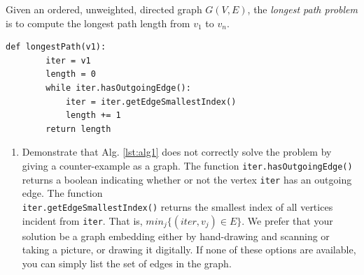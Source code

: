 \documentclass[12pt,letterpaper]{article}
\begin{document}
Given an ordered, unweighted, directed graph $G(V,E)$, the \textit{longest path problem} is to compute the longest path length from $v_1$ to $v_n$.

     \begin{lstlisting}[style = Python]
    def longestPath(v1):
        iter = v1
        length = 0
        while iter.hasOutgoingEdge():
            iter = iter.getEdgeSmallestIndex()
            length += 1
        return length
    \end{lstlisting}

\begin{enumerate}
    \item Demonstrate that Alg. \ref{lst:alg1} does not correctly solve the problem by giving a counter-example as a graph. 
    The function \texttt{iter.hasOutgoingEdge()} returns a boolean indicating whether or not the vertex \texttt{iter} has an outgoing edge.
    The function \\
    \texttt{iter.getEdgeSmallestIndex()} returns the smallest index of all vertices incident from \texttt{iter}. 
    That is, $min_j \{ (iter,v_j) \in E \}$.
    We prefer that your solution be a graph embedding either by hand-drawing and scanning or taking a picture, or drawing it digitally. 
    If none of these options are available, you can simply list the set of edges in the graph.


\end{enumerate}
\end{document}
